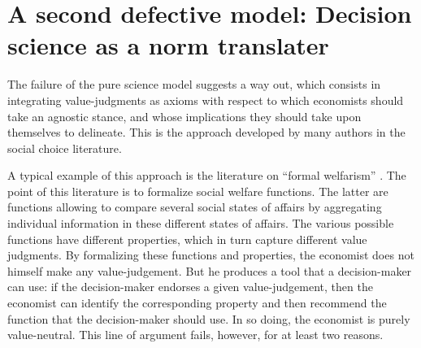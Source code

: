 \documentclass[preprint,11pt]{elsarticle}
\begin{document}
\section{A second defective model: Decision science as a norm translater}
\noindent The failure of the pure science model suggests a way out, which consists in integrating value-judgments as axioms with respect to which economists should take an agnostic stance, and whose implications they should take upon themselves to delineate. This is the approach developed by many authors in the social choice literature.

A typical example of this approach is the literature on ``formal welfarism'' \cite{fleurbaey_informational_2003}. The point of this literature is to formalize social welfare functions. The latter are functions allowing to compare several social states of affairs by aggregating individual information in these different states of affairs. The various possible functions have different properties, which in turn capture different value judgments. By formalizing these functions and properties, the economist does not himself make any value-judgement. But he produces a tool that a decision-maker can use: if the decision-maker endorses a given value-judgement, then the economist can identify the corresponding property and then recommend the function that the decision-maker should use. In so doing, the economist is purely value-neutral. This line of argument fails, however, for at least two reasons.
\end{document}
